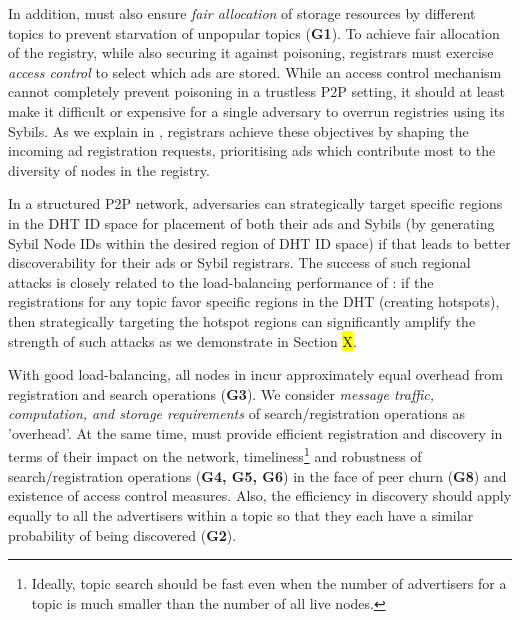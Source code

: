In addition, \sysname must also ensure \textit{fair allocation} of storage resources by different topics to prevent starvation of unpopular topics (\textbf{G1}). To achieve fair allocation of the registry, while also securing it against poisoning, registrars must exercise \textit{access control} to select which ads are stored. While an access control mechanism cannot completely prevent poisoning in a trustless P2P setting, it should at least make it difficult or expensive for a single adversary to overrun registries using its Sybils. As we explain in , registrars achieve these objectives by shaping the incoming ad registration requests, prioritising ads which contribute most to the diversity of nodes in the registry.


In a structured P2P network, adversaries can strategically target specific regions in the DHT ID space for placement of both their ads and Sybils (\ie by generating Sybil Node IDs within the desired region of DHT ID space) if that leads to better discoverability for their ads or Sybil registrars. The success of such regional attacks is closely related to the load-balancing performance of \sysname: if the registrations for any topic favor specific regions in the DHT (\ie creating hotspots), then strategically targeting the hotspot regions can significantly amplify the strength of such attacks as we demonstrate in Section \hl{X}.

 With good load-balancing, all nodes in \sysname incur approximately equal overhead from registration and search operations (\textbf{G3}). We consider \textit{message traffic, computation, and storage requirements} of search/registration operations as 'overhead'. At the same time, \sysname must provide efficient registration and discovery in terms of their impact on the network, timeliness\footnote{Ideally, topic search should be fast even when the number of advertisers for a topic is much smaller than the number of all live nodes.} and robustness of search/registration operations (\textbf{G4, G5, G6}) in the face of peer churn (\textbf{G8}) and existence of access control measures. Also, the efficiency in discovery should apply equally to all the advertisers within a topic so that they each have a similar probability of being discovered (\textbf{G2}).

